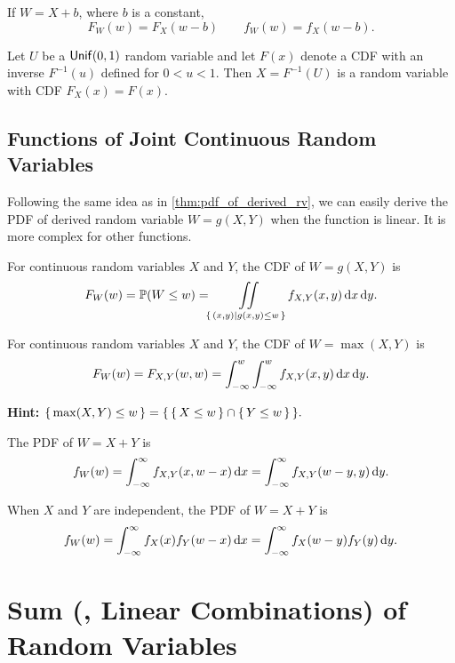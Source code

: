 \begin{theorem}
    If $W=X+b$, where $b$ is a constant,
    \[F_W(w)=F_X(w-b) \qquad f_W(w)=f_X(w-b).\]
\end{theorem}

\begin{theorem}
    Let $U$ be a $\operatorname{\mathsf{Unif}}(0,1)$ random variable and let $F(x)$ denote a \textnormal{CDF} with an inverse $F^{-1}(u)$ defined for $0<u<1$. Then $X=F^{-1}(U)$ is a random variable with \textnormal{CDF} $F_X(x)=F(x)$.
\end{theorem}

\subsection{Functions of Joint Continuous Random Variables}
Following the same idea as in \cref{thm:pdf_of_derived_rv}, we can easily derive the PDF of derived random variable $W=g(X,Y)$ when the function is linear. It is more complex for other functions.

\begin{theorem}
    For continuous random variables $X$ and $Y$, the \textnormal{CDF} of $W=g(X,Y)$ is
    \[F_W(w)=\P{W\leq w}=\iint\limits_{\set{(x,y) \mid g(x,y)\leq w}}f_{X,Y}(x,y)\diff x\diff y.\]
\end{theorem}

\begin{corollary}
    For continuous random variables $X$ and $Y$, the \textnormal{CDF} of $W=\max(X,Y)$ is
    \[F_W(w)=F_{X,Y}(w,w)=\int_{-\infty}^{w}\int_{-\infty}^{w}f_{X,Y}(x,y)\mathop{}\!\mathrm{d} x\mathop{}\!\mathrm{d} y.\]
\end{corollary}
\textbf{Hint:} $\set{\max(X,Y)\leq w}=\set{\set{X\leq w}\cap\set{Y\leq w}}.$

\begin{theorem}
    The \textnormal{PDF} of $W=X+Y$ is
    \[f_W(w)=\int_{-\infty}^{\infty}f_{X,Y}(x,w-x)\mathop{}\!\mathrm{d} x = \int_{-\infty}^{\infty}f_{X,Y}(w-y,y)\mathop{}\!\mathrm{d} y.\]
\end{theorem}

\begin{corollary}
    When $X$ and $Y$ are independent, the \textnormal{PDF} of $W=X+Y$ is
    \[f_W(w)=\int_{-\infty}^{\infty}f_{X}(x)f_Y(w-x)\mathop{}\!\mathrm{d} x = \int_{-\infty}^{\infty}f_{X}(w-y)f_Y(y)\mathop{}\!\mathrm{d} y.\]
\end{corollary}

\section{Sum (\ie, Linear Combinations) of Random Variables}
